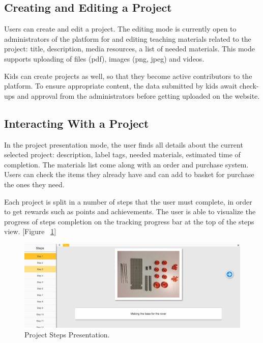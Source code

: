 \subsection{Creating and Editing a Project}
Users can create and edit a project. The editing mode is currently open to administrators of the platform for  and editing teaching materials related to the project: title, description, media resources, a list of needed materials. This mode supports uploading of files (pdf), images (png, jpeg) and videos.

Kids can create projects as well, so that they become active contributors to the platform. To ensure appropriate content, the data submitted by kids await check-ups and approval from the administrators before getting uploaded on the website.


\subsection{Interacting With a Project}
In the project presentation mode, the user finds all details about the current selected project: description, label tags, needed materials, estimated time of completion. The materials list come along with an order and purchase system. Users can check the items they already have and can add to basket for purchase the ones they need. 

Each project is split in a number of steps that the user must complete, in order to get rewards such as points and achievements. The user is able to visualize the progress of steps completion on the tracking progress bar at the top of the steps view. [Figure ~\ref{fig:project_steps}] 

\begin{figure}[h!]
\includegraphics[width=\linewidth]{images/ui/ProjectSteps.png}
\caption{Project Steps Presentation.}
\label{fig:project_steps}
\end{figure}



